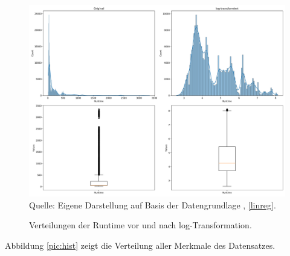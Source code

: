 \begin{figure}[!h]
    \caption{Verteilungen der Runtime vor und nach log-Transformation.}
    \includegraphics[width=1\textwidth]{../scripts/images/combined_runtime_plots.png}
    Quelle: Eigene Darstellung auf Basis der Datengrundlage \cite{misc_sgemm_gpu_kernel_performance_440}, \ref{linreg}.
    \label{pic:box}
\end{figure}

Abbildung \ref{pic:hist} zeigt die Verteilung aller Merkmale des Datensatzes. 

